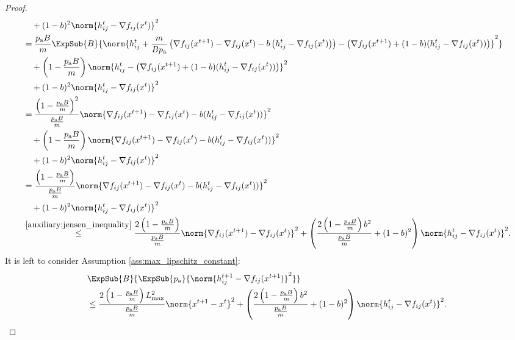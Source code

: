 \documentclass{article}
\newcommand*{\probavailable}{\ensuremath{p_{\textnormal{a}}}}
\begin{document}
\begin{proof}
\begin{align*}
    &\quad +(1 - b)^2\norm{h^{t}_{ij} - \nabla f_{ij}(x^{t})}^2 \\
    &=\frac{\probavailable B}{m} \ExpSub{B}{\norm{h^{t}_{ij} + \frac{m}{B\probavailable}\left(\nabla f_{ij}(x^{t+1}) - \nabla f_{ij}(x^{t}) - b \left(h^t_{ij} - \nabla f_{ij}(x^{t})\right)\right) - \left(\nabla f_{ij}(x^{t+1}) + (1 - b)(h^t_{ij} - \nabla f_{ij}(x^{t}))\right)}^2} \\
    &\quad + \left(1 - \frac{\probavailable B}{m}\right) \norm{h^{t}_{ij} - \left(\nabla f_{ij}(x^{t+1}) + (1 - b)(h^t_{ij} - \nabla f_{ij}(x^{t}))\right)}^2 \\
    &\quad +(1 - b)^2\norm{h^{t}_{ij} - \nabla f_{ij}(x^{t})}^2 \\
    &=\frac{\left(1 - \frac{\probavailable B}{m}\right)^2}{\frac{\probavailable B}{m}}\norm{\nabla f_{ij}(x^{t+1}) - \nabla f_{ij}(x^{t}) - b(h^t_{ij} - \nabla f_{ij}(x^{t}))}^2 \\
    &\quad + \left(1 - \frac{\probavailable B}{m}\right) \norm{\nabla f_{ij}(x^{t+1}) - \nabla f_{ij}(x^{t}) - b(h^t_{ij} - \nabla f_{ij}(x^{t}))}^2 \\
    &\quad +(1 - b)^2\norm{h^{t}_{ij} - \nabla f_{ij}(x^{t})}^2 \\
    &= \frac{\left(1 - \frac{\probavailable B}{m}\right)}{\frac{\probavailable B}{m}} \norm{\nabla f_{ij}(x^{t+1}) - \nabla f_{ij}(x^{t}) - b(h^t_{ij} - \nabla f_{ij}(x^{t}))}^2 \\
    &\quad +(1 - b)^2\norm{h^{t}_{ij} - \nabla f_{ij}(x^{t})}^2 \\
    &\overset{\eqref{auxiliary:jensen_inequality}}{\leq} \frac{2\left(1 - \frac{\probavailable B}{m}\right)}{\frac{\probavailable B}{m}} \norm{\nabla f_{ij}(x^{t+1}) - \nabla f_{ij}(x^{t})}^2 + \left(\frac{2\left(1 - \frac{\probavailable B}{m}\right) b^2}{\frac{\probavailable B}{m}} + (1 - b)^2\right) \norm{h^t_{ij} - \nabla f_{ij}(x^{t})}^2. \\
  \end{align*}
  It is left to consider Assumption \ref{ass:max_lipschitz_constant}:
  \begin{align*}
    &\ExpSub{B}{\ExpSub{\probavailable}{\norm{h^{t+1}_{ij} - \nabla f_{ij}(x^{t+1})}^2}} \\
    &\leq \frac{2\left(1 - \frac{\probavailable B}{m}\right) L_{\max}^2}{\frac{\probavailable B}{m}} \norm{x^{t+1} - x^{t}}^2 + \left(\frac{2\left(1 - \frac{\probavailable B}{m}\right) b^2}{\frac{\probavailable B}{m}} + (1 - b)^2\right) \norm{h^t_{ij} - \nabla f_{ij}(x^{t})}^2. \\

\end{align*}
\end{proof}
\end{document}
